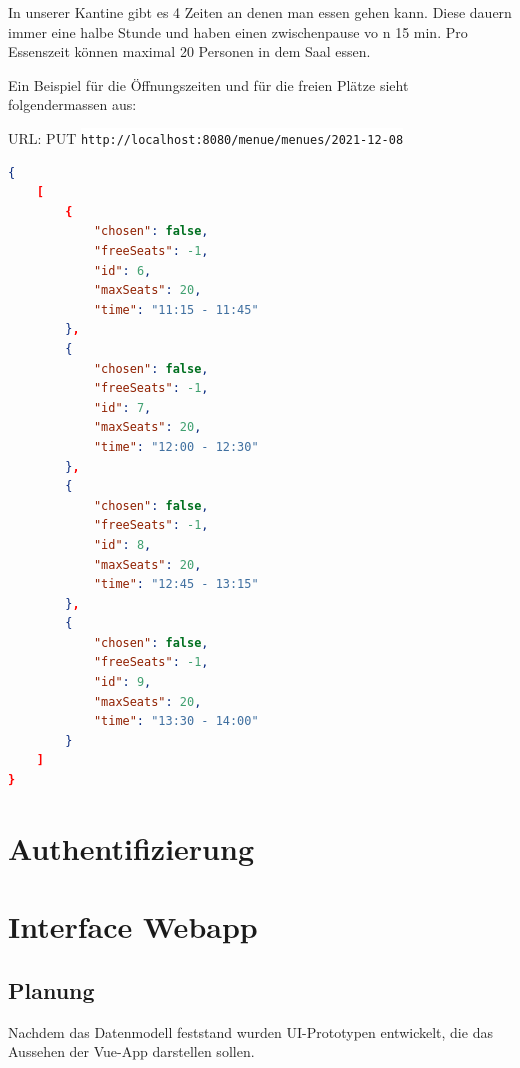 In unserer Kantine gibt es 4 Zeiten an denen man essen gehen kann. Diese dauern immer eine halbe Stunde und haben einen zwischenpause vo n 15 min. 
Pro Essenszeit können maximal 20 Personen in dem Saal essen.

Ein Beispiel für die Öffnungszeiten und für die freien Plätze sieht folgendermassen aus:

URL: PUT \colorbox{white}{\lstinline[basicstyle=\ttfamily\color{black},language=html]|http://localhost:8080/menue/menues/2021-12-08|}


\begin{lstlisting}[language=json,firstnumber=1]
{
    [
        {
            "chosen": false,
            "freeSeats": -1,
            "id": 6,
            "maxSeats": 20,
            "time": "11:15 - 11:45"
        },
        {
            "chosen": false,
            "freeSeats": -1,
            "id": 7,
            "maxSeats": 20,
            "time": "12:00 - 12:30"
        },
        {
            "chosen": false,
            "freeSeats": -1,
            "id": 8,
            "maxSeats": 20,
            "time": "12:45 - 13:15"
        },
        {
            "chosen": false,
            "freeSeats": -1,
            "id": 9,
            "maxSeats": 20,
            "time": "13:30 - 14:00"
        }
    ]
}
\end{lstlisting}

\section{Authentifizierung}

\section {Interface Webapp}
\author{Benjamin Besic}
\subsection{Planung}

Nachdem das Datenmodell feststand wurden UI-Prototypen entwickelt, die das Aussehen der Vue-App darstellen sollen.

